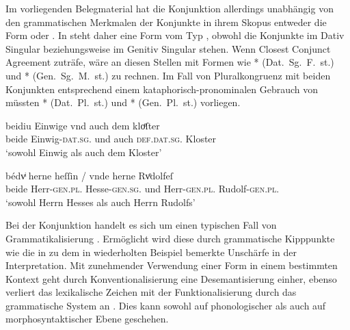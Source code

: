 Im vorliegenden Belegmaterial hat die Konjunktion allerdings unabhängig von den
grammatischen Merkmalen der Konjunkte in ihrem Skopus entweder die Form
 oder . In  steht daher eine
Form vom Typ , obwohl die Konjunkte im Dativ Singular
 beziehungsweise im Genitiv Singular
 stehen. Wenn Closest Conjunct Agreement zuträfe, wäre an diesen Stellen mit Formen wie
* (Dat.~Sg.~F.~st.) und * (Gen.~Sg.~M.~st.) zu
rechnen. Im Fall von Pluralkongruenz mit beiden Konjunkten entsprechend einem
kataphorisch-pronominalen Gebrauch von
 müssten * (Dat.\ Pl.\ st.) und *
(Gen.\ Pl.\ st.) vorliegen.

\begin{exe}
\ex \label{ex:caoconjbeide}
	\begin{xlist}
	\ex \label{ex:caoconjbeide_1}
		\gll beidiu Einwige vnd auch dem kloͤſter \\
				beide Einwig-\textsc{dat.sg.\FemF} und auch
				\textsc{def.dat.sg.\NeutM} Kloster \\
		\trans `sowohl Einwig als auch dem Kloster'
			\parencites(Nr.~2925, Landshut, 1298)[219,34]{cao4}

	\ex \label{ex:caoconjbeide_2}
		\gll bédvͥ herne heſſin / vnde herne Rvͦdolfeſ \\
			beide Herr-\textsc{gen.pl.\MascM} Hesse-\textsc{gen.sg.\MascM} {}
				und Herr-\textsc{gen.pl.\MascM} Rudolf-\textsc{gen.pl.\MascM}
				\\
		\trans `sowohl Herrn Hesses als auch Herrn Rudolfs'
			\parencites(Nr.~1318, Freiburg i.\,Br., 1290)[561,11--12]{cao2}
	\end{xlist}
\end{exe}

Bei der Konjunktion  handelt es sich um einen typischen Fall von
Grammatikalisierung \autocite[vgl.][134--188]{lehmann2015}. Ermöglicht wird
diese durch grammatische Kipppunkte wie die in  zu dem
in  wiederholten Beispiel bemerkte Unschärfe in der
Interpretation. Mit zunehmender Verwendung einer Form in einem bestimmten
Kontext geht durch Konventionalisierung eine Desemantisierung einher, ebenso
verliert das lexikalische Zeichen mit der Funktionalisierung durch das
grammatische System an . Dies kann sowohl auf phonologischer als
auch auf morphosyntaktischer Ebene geschehen.

